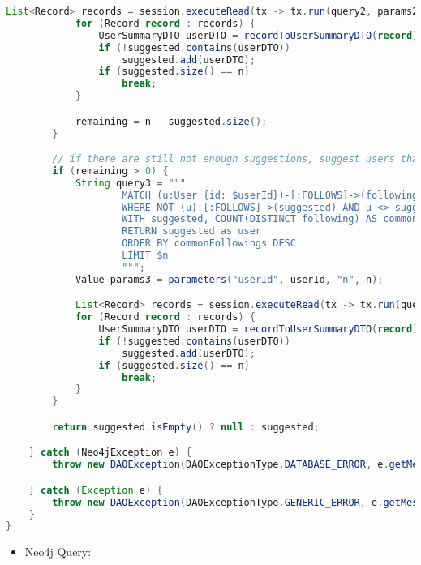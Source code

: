 \begin{mdframed}[style=customstyle]
\begin{lstlisting}[language=java]
            List<Record> records = session.executeRead(tx -> tx.run(query2, params2).list());
            for (Record record : records) {
                UserSummaryDTO userDTO = recordToUserSummaryDTO(record);
                if (!suggested.contains(userDTO))
                    suggested.add(userDTO);
                if (suggested.size() == n)
                    break;
            }

            remaining = n - suggested.size();
        }

        // if there are still not enough suggestions, suggest users that follow the user's followings
        if (remaining > 0) {
            String query3 = """
                    MATCH (u:User {id: $userId})-[:FOLLOWS]->(following:User)<-[:FOLLOWS]-(suggested:User)
                    WHERE NOT (u)-[:FOLLOWS]->(suggested) AND u <> suggested
                    WITH suggested, COUNT(DISTINCT following) AS commonFollowings
                    RETURN suggested as user
                    ORDER BY commonFollowings DESC
                    LIMIT $n
                    """;
            Value params3 = parameters("userId", userId, "n", n);

            List<Record> records = session.executeRead(tx -> tx.run(query3, params3).list());
            for (Record record : records) {
                UserSummaryDTO userDTO = recordToUserSummaryDTO(record);
                if (!suggested.contains(userDTO))
                    suggested.add(userDTO);
                if (suggested.size() == n)
                    break;
            }
        }

        return suggested.isEmpty() ? null : suggested;

    } catch (Neo4jException e) {
        throw new DAOException(DAOExceptionType.DATABASE_ERROR, e.getMessage());

    } catch (Exception e) {
        throw new DAOException(DAOExceptionType.GENERIC_ERROR, e.getMessage());
    }
}\end{lstlisting}
\end{mdframed}

\begin{itemize}
    \item Neo4j Query:
\end{itemize}

